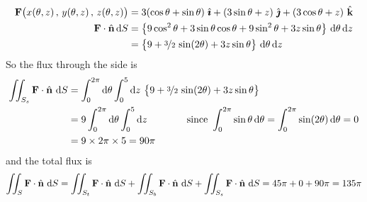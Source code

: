 \begin{eg}
\begin{align*}
\vF\big(x(\theta,z)\,,\,y(\theta,z)\,,\,z(\theta,z)\big)
&=3(\cos\theta+\sin\theta)\ \hi
  +(3\sin\theta+z)\ \hj+(3\cos\theta+z)\ \hk\\
\vF\cdot\hn\,\dee{S}
&=\big\{9\cos^2\theta+3\sin\theta\cos\theta+9\sin^2\theta+3z\sin\theta\big\}\ 
         \dee{\theta}\,\dee{z} \\
&=\big\{9 +\nicefrac{3}{2}\,\sin(2\theta)+3z\sin\theta\big\}\ 
           \dee{\theta}\,\dee{z}
\end{align*}
 So the flux through the side is
\begin{align*}
\iint_{S_s}\mathbf{F}\cdot\hat{\mathbf{n}}\ \mathrm{d}S
&=\int_0^{2\pi}\mathrm{d}\theta\int_0^5\mathrm{d}z\  
     \big\{9 +\nicefrac{3}{2}\,\sin(2\theta)+3z\sin\theta\big\} \\
&=9\int_0^{2\pi}\mathrm{d}\theta\int_0^5\mathrm{d}z
\qquad\qquad\text{since }\int_0^{2\pi}\sin\theta\,\mathrm{d}\theta
                   =\int_0^{2\pi}\sin(2\theta)\,\mathrm{d}\theta 
                   =0 \\
&=9\times 2\pi\times 5 
=90\pi
\end{align*}
and the total flux is
\begin{align*}
\iint_{S}\mathbf{F}\cdot\hat{\mathbf{n}}\ \mathrm{d}S
=\iint_{S_t}\mathbf{F}\cdot\hat{\mathbf{n}}\ \mathrm{d}S
 +\iint_{S_b}\mathbf{F}\cdot\hat{\mathbf{n}}\ \mathrm{d}S
 +\iint_{S_s}\mathbf{F}\cdot\hat{\mathbf{n}}\ \mathrm{d}S
=45\pi+0+90\pi
=135\pi
\end{align*}



\end{eg}


